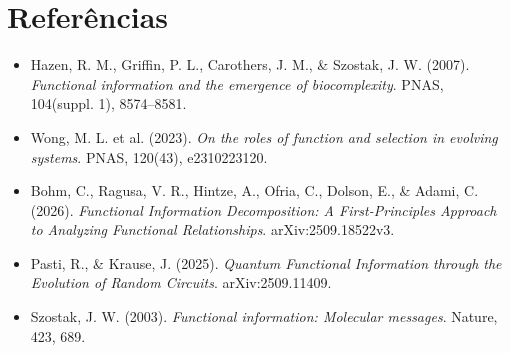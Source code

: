 \documentclass[11pt,a4paper]{article}
\begin{document}
\section*{Referências}

\begin{itemize}[leftmargin=1.5em]

    \item
    Hazen, R. M., Griffin, P. L., Carothers, J. M.,
    \& Szostak, J. W. (2007).
    \emph{Functional information and the emergence of biocomplexity}.
    PNAS, 104(suppl. 1), 8574--8581.

    \item
    Wong, M. L. et al. (2023).
    \emph{On the roles of function and selection in evolving systems}.
    PNAS, 120(43), e2310223120.

    \item
    Bohm, C., Ragusa, V. R., Hintze, A., Ofria, C.,
    Dolson, E., \& Adami, C. (2026).
    \emph{Functional Information Decomposition:
    A First-Principles Approach to Analyzing Functional Relationships}.
    arXiv:2509.18522v3.

    \item
    Pasti, R., \& Krause, J. (2025).
    \emph{Quantum Functional Information through the Evolution
    of Random Circuits}.
    arXiv:2509.11409.

    \item
    Szostak, J. W. (2003).
    \emph{Functional information: Molecular messages}.
    Nature, 423, 689.

\end{itemize}
\end{document}
